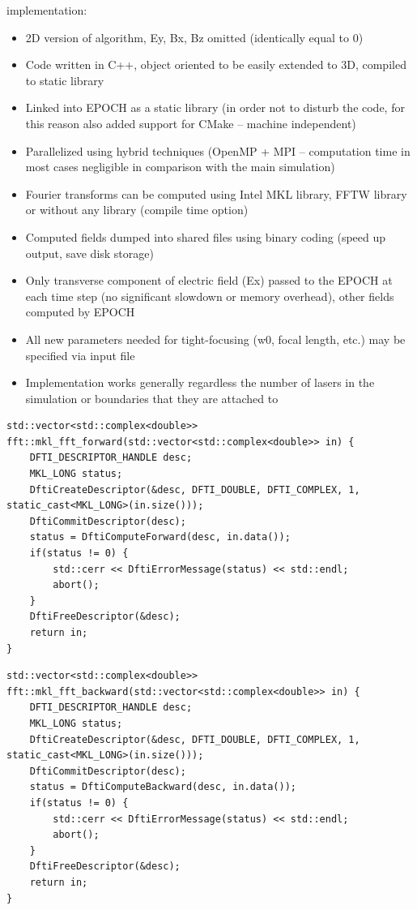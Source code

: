 \noindent
implementation:
\begin{itemize}
	\item 2D version of algorithm, Ey, Bx, Bz omitted (identically equal to 0) 
	\item Code written in C++, object oriented to be easily extended to 3D, compiled to static library
	\item Linked into EPOCH as a static library (in order not to disturb the code, for this reason also added support for CMake – machine independent)
	\item Parallelized using hybrid techniques (OpenMP + MPI – computation time in most cases negligible in comparison with the main simulation)
	\item Fourier transforms can be computed using Intel MKL library, FFTW library or without any library (compile time option)
	\item Computed fields dumped into shared files using binary coding (speed up output, save disk storage)
	\item Only transverse component of electric field (Ex) passed to the EPOCH at each time step (no significant slowdown or memory overhead), other fields computed by EPOCH
	\item All new parameters needed for tight-focusing (w0, focal length, etc.) may be specified via input file
	\item Implementation works generally regardless the number of lasers in the simulation or boundaries that they are attached to
\end{itemize}

\begin{lstlisting}[style=CXX, caption=Function performing forward fast Fourier transform using MKL library]
std::vector<std::complex<double>> fft::mkl_fft_forward(std::vector<std::complex<double>> in) {
	DFTI_DESCRIPTOR_HANDLE desc;
	MKL_LONG status;
	DftiCreateDescriptor(&desc, DFTI_DOUBLE, DFTI_COMPLEX, 1, static_cast<MKL_LONG>(in.size()));
	DftiCommitDescriptor(desc);
	status = DftiComputeForward(desc, in.data());
	if(status != 0) {
		std::cerr << DftiErrorMessage(status) << std::endl;
		abort();
	}
	DftiFreeDescriptor(&desc);
	return in;
}
\end{lstlisting}

\begin{lstlisting}[style=CXX, caption=Function performing backward fast Fourier transform using MKL library]
std::vector<std::complex<double>> fft::mkl_fft_backward(std::vector<std::complex<double>> in) {
	DFTI_DESCRIPTOR_HANDLE desc;
	MKL_LONG status;
	DftiCreateDescriptor(&desc, DFTI_DOUBLE, DFTI_COMPLEX, 1, static_cast<MKL_LONG>(in.size()));
	DftiCommitDescriptor(desc);
	status = DftiComputeBackward(desc, in.data());
	if(status != 0) {
		std::cerr << DftiErrorMessage(status) << std::endl;
		abort();
	}
	DftiFreeDescriptor(&desc);
	return in;
}
\end{lstlisting}

